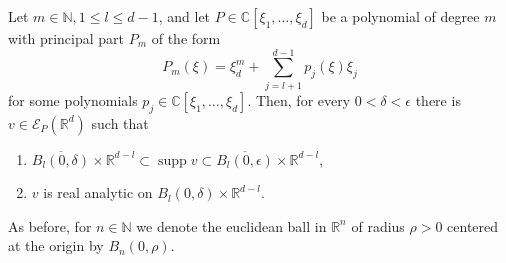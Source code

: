 \documentclass[10pt,a4paper]{amsart}
\newcommand{\C}{\mathbb{C}}
\newcommand{\N}{\mathbb{N}}
\newcommand{\R}{\mathbb{R}}
\begin{document}
\begin{theorem}\label{th:zero solution standard form}
	Let $m\in\N, 1\leq l\leq d-1$, and let $P\in\C[\xi_1,\ldots,\xi_d]$ be a polynomial of degree $m$ with principal part $P_m$ of the form 
    \[P_m(\xi)=\xi_d^m+\sum_{j=l+1}^{d-1}p_j(\xi)\xi_j\]
    for some polynomials $p_j\in\C[\xi_1,\ldots,\xi_d]$.
    Then, for every $0<\delta<\epsilon$ there is $v\in\mathscr{E}_P(\R^d)$ such that
	\begin {enumerate}[{\upshape(i)}]
	\item $\overline{B_{l}(0,\delta)}\times\R^{d-l}\subset\operatorname{supp} v\subset \overline{B_{l}(0,\epsilon)}\times\R^{d-l}$,
	\item $v$ is real analytic on $B_{l}(0,\delta)\times\R^{d-l}$.
	\end{enumerate} 
    As before, for $n\in\N$ we denote the euclidean ball in $\R^n$ of radius $\rho>0$ centered at the origin by $B_n(0,\rho)$.
\end{theorem}
\end{document}
